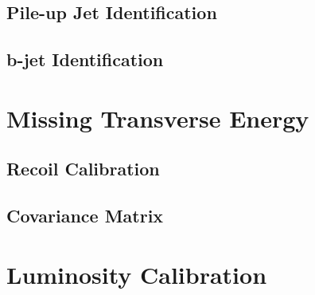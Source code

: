 
\subsection{Pile-up Jet Identification} %
\label{sub:pile_up_jet_identification}


\subsection{b-jet Identification} %
\label{sub:b_jet_identification}



\section{Missing Transverse Energy} %
\label{sec:missing_transverse_energy}

\subsection{Recoil Calibration} %
\label{sub:recoil_calibration}


\subsection{Covariance Matrix} %
\label{sub:covariance_matrix}


\section{Luminosity Calibration} %
\label{sec:luminosity_calibration}


